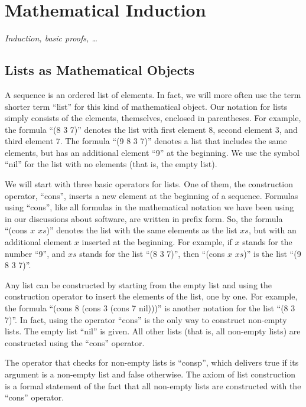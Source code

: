 \chapter{Mathematical Induction}

\textit{Induction, basic proofs, \dots}

\section{Lists as Mathematical Objects}
\label{sec:lists-as-obj}
A sequence is an ordered list of elements. In fact, we will more often use the term shorter term ``list'' for this kind of mathematical object. Our notation for lists simply consists of the elements, themselves,  enclosed in parentheses. For example, the formula ``(8 3 7)'' denotes the list with first element 8, second element 3, and third element 7. The formula ``(9 8 3 7)'' denotes a list that includes the same elements, but has an additional element ``9'' at the beginning. We use the symbol ``nil'' for the list with no elements (that is, the empty list).

We will start with three basic operators for lists. One of them, the construction operator, ``cons'', inserts a new element at the beginning of a sequence. Formulas using ``cons'', like all formulas in the mathematical notation we have been using in our discussions about software, are written in prefix form. So, the formula ``(cons $x$ $xs$)'' denotes the list with the same elements as the list $xs$, but with an additional element $x$ inserted at the beginning. For example, if $x$ stands for the number ``9'', and $xs$ stands for the list ``(8 3 7)'', then ``(cons $x$ $xs$)'' is the list ``(9 8 3 7)''.

Any list can be constructed by starting from the empty list and using the construction operator to insert the elements of the list, one by one. For example, the formula ``(cons 8 (cons 3 (cons 7 nil)))'' is another notation for the list ``(8 3 7)''. In fact, using the operator ``cons'' is the only way to construct non-empty lists. The empty list ``nil'' is given. All other lists (that is, all non-empty lists) are constructed using the ``cons'' operator.

The operator that checks for non-empty lists is ``consp'', which delivers true if its argument is a non-empty list and false otherwise.
The axiom of list construction is a formal statement of the fact that all non-empty lists are constructed with the ``cons'' operator.

